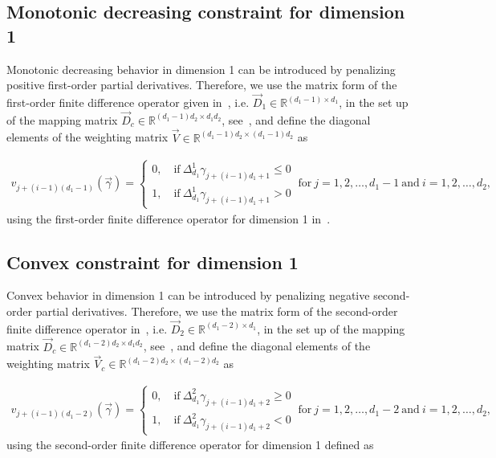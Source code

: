 \subsection{Monotonic decreasing constraint for dimension 1} \label{subsec:MDC-TP-one-dim}

Monotonic decreasing behavior in dimension 1 can be introduced by penalizing positive first-order partial derivatives. Therefore, we use the matrix form of the first-order finite difference operator given in~, i.e. $\vec{D}_1 \in \mathbb{R}^{(d_1-1) \times d_1}$, in the set up of the mapping matrix $\vec{D}_c \in \mathbb{R}^{(d_1-1)d_2 \times d_1d_2}$, see~, and define the diagonal elements of the weighting matrix $\vec{V} \in \mathbb{R}^{(d_1-1)d_2 \times (d_1-1)d_2}$ as

\begin{align} \label{}
	v_{j+(i-1)(d_1-1)} (\vec{\gamma}) = \begin{cases}
		0, \quad \text{if} \ \Delta^1_{d_1} \gamma_{j+(i-1)d_1 + 1} \le 0 \\ 
		1, \quad \text{if} \ \Delta^1_{d_1} \gamma_{j+(i-1)d_1 + 1} > 0
	\end{cases}	\ \text{for} \ j=1,2,\dots,d_1-1 \ \text{and} \ i=1,2,\dots,d_2,
\end{align}
%
using the first-order finite difference operator for dimension 1 in~.

\subsection{Convex constraint for dimension 1} \label{subsec:CONV-TP-one-dim}

Convex behavior in dimension 1 can be introduced by penalizing negative second-order partial derivatives. Therefore, we  use the matrix form of the second-order finite difference operator in~, i.e. $\vec{D}_2 \in \mathbb{R}^{(d_1-2) \times d_1}$, in the set up of the mapping matrix $\vec{D}_c \in \mathbb{R}^{(d_1-2)d_2 \times d_1d_2}$, see~, and define the diagonal elements of the weighting matrix $\vec{V}_c \in \mathbb{R}^{(d_1-2)d_2 \times (d_1-2)d_2}$ as

\begin{align} \label{}
	v_{j+(i-1)(d_1-2)}(\vec{\gamma}) = \begin{cases}
		0, \quad \text{if} \ \Delta^2_{d_1} \gamma_{j+(i-1)d_1+2} \ge 0 \\ 
		1, \quad \text{if} \ \Delta^2_{d_1} \gamma_{j+(i-1)d_1+2} < 0
	\end{cases}	\ \text{for} \ j=1,2,\dots,d_1-2 \ \text{and} \ i=1,2,\dots,d_2,
\end{align}
%
using the second-order finite difference operator for dimension 1 defined as

